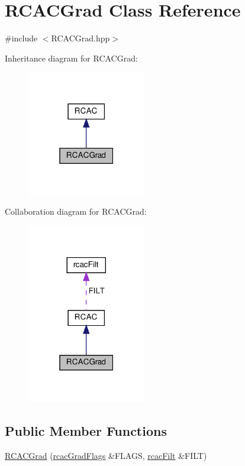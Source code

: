 \hypertarget{class_r_c_a_c_grad}{}\section{R\+C\+A\+C\+Grad Class Reference}
\label{class_r_c_a_c_grad}


{\ttfamily \#include $<$R\+C\+A\+C\+Grad.\+hpp$>$}



Inheritance diagram for R\+C\+A\+C\+Grad\+:\nopagebreak
\begin{figure}[H]
\begin{center}
\leavevmode
\includegraphics[width=147pt]{class_r_c_a_c_grad__inherit__graph}
\end{center}
\end{figure}


Collaboration diagram for R\+C\+A\+C\+Grad\+:\nopagebreak
\begin{figure}[H]
\begin{center}
\leavevmode
\includegraphics[width=147pt]{class_r_c_a_c_grad__coll__graph}
\end{center}
\end{figure}
\subsection*{Public Member Functions}
\begin{DoxyCompactItemize}
\item 
\hyperlink{class_r_c_a_c_grad_a62f433bc3efdfc5133105c5b2fd59ea6}{R\+C\+A\+C\+Grad} (\hyperlink{structrcac_grad_flags}{rcac\+Grad\+Flags} \&F\+L\+A\+GS, \hyperlink{structrcac_filt}{rcac\+Filt} \&F\+I\+LT)
\end{DoxyCompactItemize}
